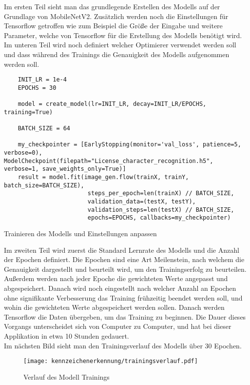 Im ersten Teil sieht man das grundlegende Erstellen des Modells auf der Grundlage von MobileNetV2. Zusätzlich werden noch die Einstellungen für 
Tensorflow getroffen wie zum Beispiel die Größe der Eingabe und weitere Parameter, welche von Tensorflow für die Erstellung des Modells benötigt wird. 
Im unteren Teil wird noch definiert welcher Optimierer verwendet werden soll und dass während des Trainings die Genauigkeit des Modells aufgenommen werden soll.

\begin{longlisting}
    \begin{verbatim}
    INIT_LR = 1e-4
    EPOCHS = 30

    model = create_model(lr=INIT_LR, decay=INIT_LR/EPOCHS, training=True)

    BATCH_SIZE = 64

    my_checkpointer = [EarlyStopping(monitor='val_loss', patience=5, verbose=0), ModelCheckpoint(filepath="License_character_recognition.h5", verbose=1, save_weights_only=True)]
    result = model.fit(image_gen.flow(trainX, trainY, batch_size=BATCH_SIZE), 
                        steps_per_epoch=len(trainX) // BATCH_SIZE, 
                        validation_data=(testX, testY), 
                        validation_steps=len(testX) // BATCH_SIZE, 
                        epochs=EPOCHS, callbacks=my_checkpointer)
    \end{verbatim}
    \caption{Trainieren des Modells und Einstellungen anpassen}
\end{longlisting}

Im zweiten Teil wird zuerst die Standard Lernrate des Modells und die Anzahl der Epochen definiert. Die Epochen sind eine Art Meilenstein, 
nach welchem die Genauigkeit dargestellt und beurteilt wird, um den Trainingserfolg zu beurteilen. Außerdem werden nach jeder Epoche die gewichteten Werte 
angepasst und abgespeichert. Danach wird noch eingestellt nach welcher Anzahl an Epochen ohne signifikante Verbesserung das Training frühzeitig 
beendet werden soll, und wohin die gewichteten Werte abgespeichert werden sollen. Danach werden Tensorflow die Daten übergeben, um das Training 
zu beginnen. Die Dauer dieses Vorgangs unterscheidet sich von Computer zu Computer, und hat bei dieser Applikation in etwa 10 Stunden gedauert.\\

Im nächsten Bild sieht man den Trainingsverlauf des Modells über 30 Epochen.

\begin{figure}[H]
    \centering
    \texttt{[image: kennzeichenerkennung/trainingsverlauf.pdf]}
    \caption{Verlauf des Modell Trainings}
\end{figure}

